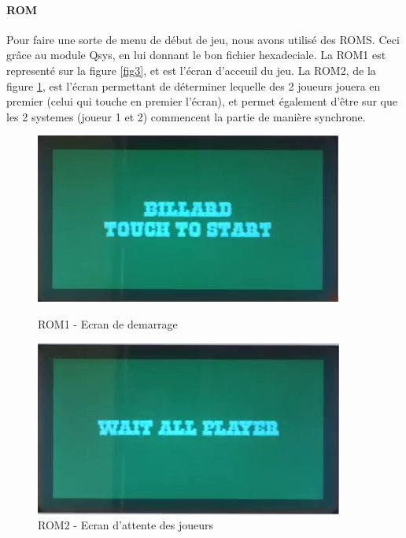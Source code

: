 
\paragraph{ROM}

Pour faire une sorte de menu de début de jeu, nous avons utilisé des ROMS. Ceci grâce au module Qsys, en lui donnant le bon fichier hexadeciale. La ROM1 est representé sur la figure \ref{fig3}, et est l'écran d'acceuil du jeu. La ROM2, de la figure \ref{fig4}, est l'écran permettant de déterminer lequelle des 2 joueurs jouera en premier (celui qui touche en premier l'écran), et  permet également d'être sur que les 2 systemes (joueur 1 et 2) commencent la partie de manière synchrone.

\begin{figure}[!ht]
   \begin{minipage}[c]{.46\linewidth}
      \includegraphics[scale=0.65]{start.png}
      \caption{ROM1 - Ecran de demarrage}
      \label{fig3}
   \end{minipage} \hfill
   \begin{minipage}[c]{.46\linewidth}
      \includegraphics[scale=0.65]{Wait_all_player.png}
      \caption{ROM2 - Ecran d'attente des joueurs
      \label{fig4}}
   \end{minipage}
\end{figure}

